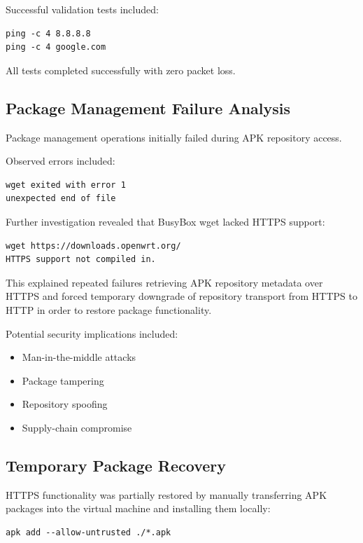 \documentclass[conference]{IEEEtran}
\begin{document}
Successful validation tests included:

\begin{lstlisting}
ping -c 4 8.8.8.8
ping -c 4 google.com
\end{lstlisting}

All tests completed successfully with zero packet loss.

\subsection{Package Management Failure Analysis}

Package management operations initially failed during APK repository access.

Observed errors included:

\begin{lstlisting}
wget exited with error 1
unexpected end of file
\end{lstlisting}

Further investigation revealed that BusyBox wget lacked HTTPS support:

\begin{lstlisting}
wget https://downloads.openwrt.org/
HTTPS support not compiled in.
\end{lstlisting}

This explained repeated failures retrieving APK repository metadata over HTTPS and forced temporary downgrade of repository transport from HTTPS to HTTP in order to restore package functionality.

Potential security implications included:

\begin{itemize}
    \item Man-in-the-middle attacks
    \item Package tampering
    \item Repository spoofing
    \item Supply-chain compromise
\end{itemize}

\subsection{Temporary Package Recovery}

HTTPS functionality was partially restored by manually transferring APK packages into the virtual machine and installing them locally:

\begin{lstlisting}
apk add --allow-untrusted ./*.apk
\end{lstlisting}
\end{document}
